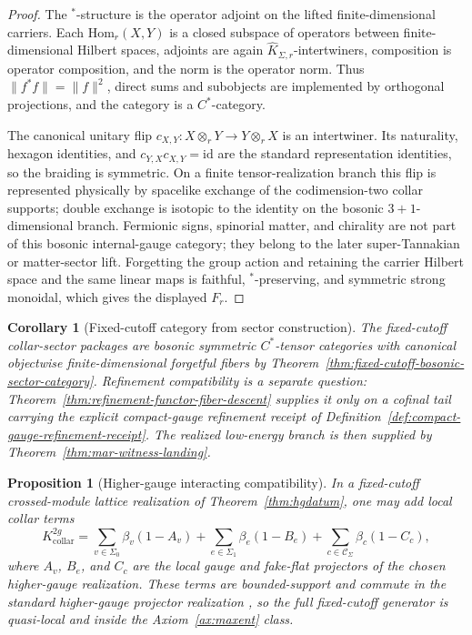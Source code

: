 \documentclass[11pt]{article}
\newtheorem{corollary}[theorem]{Corollary}
\newtheorem{proposition}[theorem]{Proposition}
\begin{document}
\begin{proof}
The \(^*\)-structure is the operator adjoint on the lifted finite-dimensional carriers. Each
\(\mathrm{Hom}_r(X,Y)\) is a closed subspace of operators between finite-dimensional Hilbert
spaces, adjoints are again \(\widehat K_{\Sigma,r}\)-intertwiners, composition is operator
composition, and the norm is the operator norm. Thus \(\|f^*f\|=\|f\|^2\), direct sums and
subobjects are implemented by orthogonal projections, and the category is a \(C^*\)-category.

The canonical unitary flip
\(c_{X,Y}:X\otimes_rY\to Y\otimes_rX\) is an intertwiner. Its naturality, hexagon identities,
and \(c_{Y,X}c_{X,Y}=\mathrm{id}\) are the standard representation identities, so the braiding is
symmetric. On a finite tensor-realization branch this flip is represented physically by spacelike
exchange of the codimension-two collar supports; double exchange is isotopic to the identity on
the bosonic \(3+1\)-dimensional branch. Fermionic signs, spinorial matter, and chirality are not part of this
bosonic internal-gauge category; they belong to the later super-Tannakian or matter-sector lift.
Forgetting the group action and retaining the carrier Hilbert space and the same linear maps is
faithful, \(^*\)-preserving, and symmetric strong monoidal, which gives the displayed \(F_r\).
\end{proof}

\begin{corollary}[Fixed-cutoff category from sector construction]\label{cor:fixed-cutoff-category-sector-construction}
The fixed-cutoff collar-sector packages are bosonic symmetric \(C^*\)-tensor categories with
canonical objectwise finite-dimensional forgetful fibers by
Theorem~\ref{thm:fixed-cutoff-bosonic-sector-category}. Refinement compatibility is a separate
question: Theorem~\ref{thm:refinement-functor-fiber-descent} supplies it only on a cofinal tail
carrying the explicit compact-gauge refinement receipt of
Definition~\ref{def:compact-gauge-refinement-receipt}. The realized low-energy branch is then
supplied by Theorem~\ref{thm:mar-witness-landing}.
\end{corollary}

\begin{proposition}[Higher-gauge interacting compatibility]\label{prop:hginteracting}
In a fixed-cutoff crossed-module lattice realization of Theorem~\ref{thm:hgdatum}, one may add local collar terms
\[
K_{\mathrm{collar}}^{2g}
=
\sum_{v\in\Sigma_0}\beta_v(1-A_v)
+
\sum_{e\in\Sigma_1}\beta_e(1-B_e)
+
\sum_{c\in\mathcal C_\Sigma}\beta_c(1-C_c),
\]
where \(A_v\), \(B_e\), and \(C_c\) are the local gauge and fake-flat projectors of the chosen higher-gauge realization. These terms are bounded-support and commute in the standard higher-gauge projector realization \cite{bullivant17}, so the full fixed-cutoff generator is quasi-local and inside the Axiom~\ref{ax:maxent} class.
\end{proposition}
\end{document}
